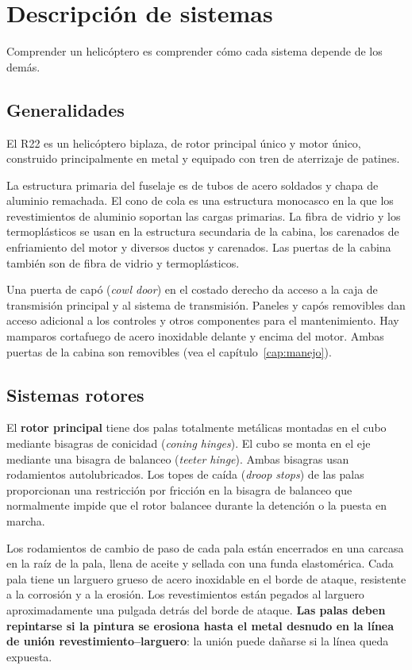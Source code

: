 \chapter{Descripción de sistemas}
\label{cap:sistemas}

\opening{Comprender un helicóptero es comprender cómo cada sistema depende de los demás.}

\section{Generalidades}

El R22 es un helicóptero biplaza, de rotor principal único y motor único, construido principalmente en metal y equipado con tren de aterrizaje de patines.

La estructura primaria del fuselaje es de tubos de acero soldados y chapa de aluminio remachada. El cono de cola es una estructura monocasco en la que los revestimientos de aluminio soportan las cargas primarias. La fibra de vidrio y los termoplásticos se usan en la estructura secundaria de la cabina, los carenados de enfriamiento del motor y diversos ductos y carenados. Las puertas de la cabina también son de fibra de vidrio y termoplásticos.

Una puerta de capó (\emph{cowl door}) en el costado derecho da acceso a la caja de transmisión principal y al sistema de transmisión. Paneles y capós removibles dan acceso adicional a los controles y otros componentes para el mantenimiento. Hay mamparos cortafuego de acero inoxidable delante y encima del motor. Ambas puertas de la cabina son removibles (vea el capítulo~\ref{cap:manejo}).

\section{Sistemas rotores}

El \textbf{rotor principal} tiene dos palas totalmente metálicas montadas en el cubo mediante bisagras de conicidad (\emph{coning hinges}). El cubo se monta en el eje mediante una bisagra de balanceo (\emph{teeter hinge}). Ambas bisagras usan rodamientos autolubricados. Los topes de caída (\emph{droop stops}) de las palas proporcionan una restricción por fricción en la bisagra de balanceo que normalmente impide que el rotor balancee durante la detención o la puesta en marcha.

Los rodamientos de cambio de paso de cada pala están encerrados en una carcasa en la raíz de la pala, llena de aceite y sellada con una funda elastomérica. Cada pala tiene un larguero grueso de acero inoxidable en el borde de ataque, resistente a la corrosión y a la erosión. Los revestimientos están pegados al larguero aproximadamente una pulgada detrás del borde de ataque. \textbf{Las palas deben repintarse si la pintura se erosiona hasta el metal desnudo en la línea de unión revestimiento--larguero}: la unión puede dañarse si la línea queda expuesta.

